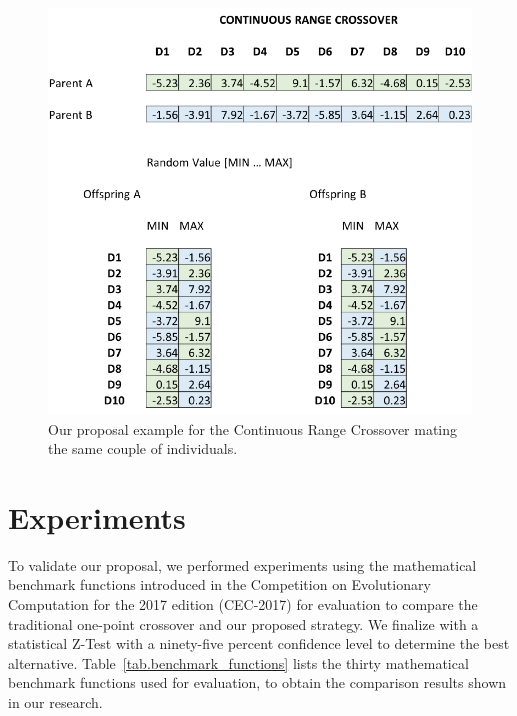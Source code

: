 \documentclass[graybox]{svmult}
\begin{document}
    \begin{figure}[!ht]
        \centering
        \includegraphics[width=0.90\linewidth]{img/fig_contrange_crossover.pdf}
        \caption{Our proposal example for the Continuous Range Crossover mating the same couple of individuals.} \label{fig.contrange_crossover}
        \end{figure}        
    
    \FloatBarrier


\section{Experiments}
    \label{section.experiments}

    To validate our proposal, we performed experiments using the mathematical benchmark functions introduced in the Competition on Evolutionary Computation for the 2017 edition (CEC-2017) for evaluation to compare the traditional one-point crossover and our proposed strategy. We finalize with a statistical Z-Test with a ninety-five percent confidence level to determine the best alternative. Table~\ref{tab.benchmark_functions} lists the thirty mathematical benchmark functions used for evaluation, to obtain the comparison results shown in our research.
\end{document}
